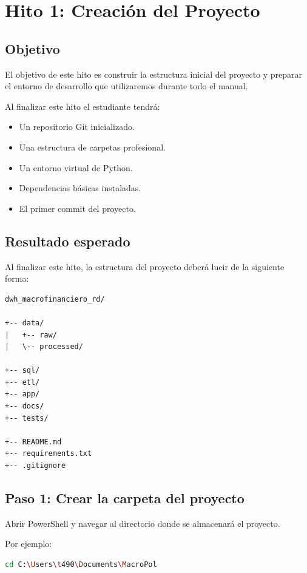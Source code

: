\chapter{Hito 1: Creación del Proyecto}

\section{Objetivo}

El objetivo de este hito es construir la estructura inicial del proyecto y preparar el entorno de desarrollo que utilizaremos durante todo el manual.

Al finalizar este hito el estudiante tendrá:

\begin{itemize}
\item Un repositorio Git inicializado.
\item Una estructura de carpetas profesional.
\item Un entorno virtual de Python.
\item Dependencias básicas instaladas.
\item El primer commit del proyecto.
\end{itemize}

\section{Resultado esperado}

Al finalizar este hito, la estructura del proyecto deberá lucir de la siguiente forma:

\begin{verbatim}
dwh_macrofinanciero_rd/

+-- data/
|   +-- raw/
|   \-- processed/

+-- sql/
+-- etl/
+-- app/
+-- docs/
+-- tests/

+-- README.md
+-- requirements.txt
+-- .gitignore
\end{verbatim}

\section{Paso 1: Crear la carpeta del proyecto}

Abrir PowerShell y navegar al directorio donde se almacenará el proyecto.

Por ejemplo:

\begin{lstlisting}[language=bash]
cd C:\Users\t490\Documents\MacroPol
\end{lstlisting}

